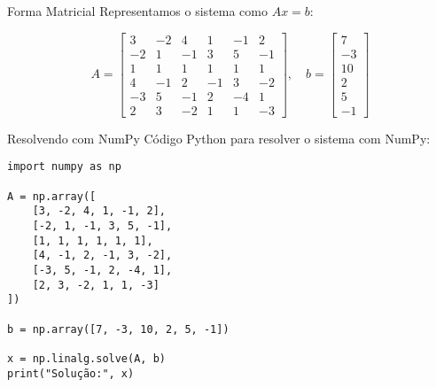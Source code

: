\begin{frame}{Forma Matricial}
    Representamos o sistema como \(Ax = b\):

    \[
        A = \begin{bmatrix}
            3  & -2 & 4  & 1  & -1 & 2  \\
            -2 & 1  & -1 & 3  & 5  & -1 \\
            1  & 1  & 1  & 1  & 1  & 1  \\
            4  & -1 & 2  & -1 & 3  & -2 \\
            -3 & 5  & -1 & 2  & -4 & 1  \\
            2  & 3  & -2 & 1  & 1  & -3
        \end{bmatrix}, \quad
        b = \begin{bmatrix}
            7 \\ -3 \\ 10 \\ 2 \\ 5 \\ -1
        \end{bmatrix}
    \]
\end{frame}

\begin{frame}[fragile]{Resolvendo com NumPy}
    Código Python para resolver o sistema com NumPy:

    \begin{verbatim}
import numpy as np

A = np.array([
    [3, -2, 4, 1, -1, 2],
    [-2, 1, -1, 3, 5, -1],
    [1, 1, 1, 1, 1, 1],
    [4, -1, 2, -1, 3, -2],
    [-3, 5, -1, 2, -4, 1],
    [2, 3, -2, 1, 1, -3]
])

b = np.array([7, -3, 10, 2, 5, -1])

x = np.linalg.solve(A, b)
print("Solução:", x)
\end{verbatim}
\end{frame}


